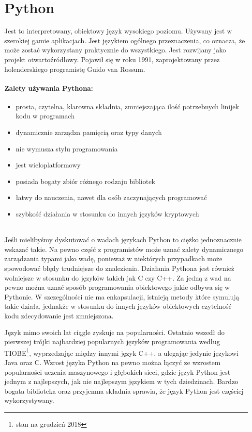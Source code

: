 \documentclass[a4paper,12pt,twoside,openany]{report}
\begin{document}
\section{Python}
Jest to interpretowany, obiektowy język wysokiego poziomu. Używany jest w szerokiej gamie  aplikacjach. Jest językiem ogólnego przeznaczenia, co oznacza, że może zostać wykorzystany praktycznie do wszystkiego. Jest rozwijany jako projekt otwartoźródłowy. Pojawił się w roku 1991, zaprojektowany przez holenderskiego programistę Guido van Rossum.

\paragraph{Zalety używania Pythona:}
\begin{itemize} 
	\item prosta, czytelna, klarowna składnia, zmniejszająca ilość potrzebnych linijek kodu w programach
	\item dynamicznie zarządza pamięcią oraz typy danych
	\item nie wymusza stylu programowania
	\item jest wieloplatformowy
	\item posiada bogaty zbiór różnego rodzaju bibliotek
	\item łatwy do nauczenia, nawet dla osób zaczynających programować
	\item szybkość działania w stosunku do innych języków kryptowych
\end{itemize} 
\mbox{} \\
Jeśli mielibyśmy dyskutować o wadach językach Python to ciężko jednoznacznie wskazać takie. Na pewno część z programistów może uznać zalety dynamicznego zarządzania typami jako wadę, ponieważ w niektórych przypadkach może spowodować błędy trudniejsze do znalezienia. Działania Pythona jest również wolniejsze w stosunku do języków takich jak C czy C++.  Za jedną z wad na pewno można uznać sposób programowania obiektowego jakie odbywa się w Pythonie. W szczególności nie ma enkapsulacji, istnieją metody które symulują takie działa, jednakże w stosunku do innych języków  obiektowych czytelność kodu zdecydowanie jest zmniejszona.

Język mimo swoich lat ciągle zyskuje na popularności. Ostatnio wszedł do pierwszej trójki najbardziej popularnych języków programowania według TIOBE\footnote{stan na grudzień 2018}, wyprzedzając między innymi język C++, a ulegając jedynie językowi Java oraz C. Wzrost języka Python na pewno można łączyć ze wzrostem popularności uczenia maszynowego i głębokich sieci, gdzie język Python jest jednym z najlepszych, jak nie najlepszym językiem w tych dziedzinach. Bardzo bogata biblioteka oraz przyjemna składnia sprawia, że język Python jest częściej wykorzystywany.  
\end{document}
